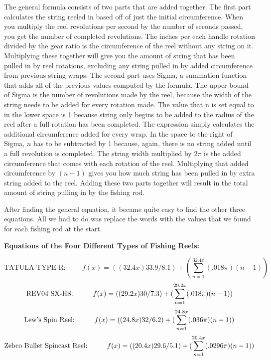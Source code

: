 The general formula consists of two parts that are added together. The first part calculates the string reeled in based off of just the initial circumference. When you multiply the reel revolutions per second by the number of seconds passed, you get the number of completed revolutions. The inches per each handle rotation divided by the gear ratio is the circumference of the reel without any string on it. Multiplying these together will give you the amount of string that has been pulled in by reel rotations, excluding any string pulled in by added circumference from previous string wraps. The second part uses Sigma, a summation function that adds all of the previous values computed by the formula. The upper bound of Sigma is the number of revolutions made by the reel, because the width of the string needs to be added for every rotation made. The value that n is set equal to in the lower space is 1 because string only begins to be added to the radius of the reel after a full rotation has been completed. The expression simply calculates the additional circumference added for every wrap. In the space to the right of Sigma, $n$ has to be subtracted by 1 because, again, there is no string added until a full revolution is completed. The string width multiplied by $2\pi$ is the added circumference that comes with each rotation of the reel. Multiplying that added circumference by $(n-1)$ gives you how much string has been pulled in by extra string added to the reel. Adding these two parts together will result in the total amount of string pulling in by the fishing rod.

After finding the general equation, it became quite easy to find the other three equations. All we had to do was replace the words with the values that we found for each fishing rod at the start.

\noindent
\textbf{Equations of the Four Different Types of Fishing Reels:}

$$
\text{TATULA TYPE-R:} \hspace{1cm} f(x) = ((32.4x)33.9/8.1) + (\sum_{n=1}^{32.4x} (.018\pi)(n-1))
$$
$$
\text{REV04 SX-HS:} \hspace{1cm} f(x) = ((29.2x)30/7.3) + (\sum_{n=1}^{29.2x} (.018\pi)(n-1))\\
$$
$$
\text{Lew's Spin Reel:} \hspace{1cm} f(x) = ((24.8x)32/6.2) + (\sum_{n=1}^{24.8x} (.036\pi)(n-1))\\
$$
$$
\text{Zebco Bullet Spincast Reel:} \hspace{1cm} f(x) = ((20.4x)29.6/5.1) + (\sum_{n=1}^{20.4x} (.0296\pi)(n-1))\\
$$


